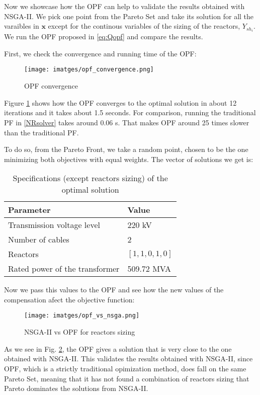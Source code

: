 \documentclass[a4paper,11pt, titlepage, twoside]{article}
\begin{document}
Now we showcase how the OPF can help to validate the results obtained with NSGA-II. We pick one point from the Pareto Set and  take its solution for all the varaibles in $\mathbf{x}$
except for the continous variables of the sizing of the reactors, $Y_{sh_i}$. We run the OPF proposed in \ref{eq:Qopf} and compare the results.

First, we check the convergence and running time of the OPF:
\begin{figure}[H]
    \centering
    \texttt{[image: imatges/opf\_convergence.png]}
    \caption{OPF convergence}
    \label{fig:opfconv}   
\end{figure}
Figure \ref{fig:opfconv} shows how the OPF converges to the optimal solution in about 12 iterations and it takes about 1.5 seconds. For comparison, running the traditional PF in \ref{NRsolver} takes around 0.06 s.
That makes OPF around 25 times slower than the traditional PF.

To do so, from the Pareto Front, we take a random point, chosen to be the one minimizing both objectives with equal weights. The vector of solutions we get is:
\begin{table}[H]
    \centering
    \begin{tabular}{l l}
    \hline
    \textbf{Parameter} & \textbf{Value} \\
    \hline
    Transmission voltage level & 220 kV \\
    Number of cables & 2 \\
    Reactors & $[1, 1, 0, 1, 0]$ \\
    Rated power of the transformer & 509.72 MVA \\
    \hline
    \end{tabular}
    \caption{Specifications (except reactors sizing) of the optimal solution}
    \label{table:optimalvaluesdicrete}
    \end{table}

Now we pass this values to the OPF and see how the new values of the compensation afect the objective function:
\begin{figure}[H]
    \centering
    \texttt{[image: imatges/opf\_vs\_nsga.png]}
    \caption{NSGA-II vs OPF for reactors sizing}
    \label{fig:opfvsnsga}   
\end{figure}
As we see in Fig. \ref{fig:opfvsnsga}, the OPF gives a solution that is very close to the one obtained with NSGA-II. This validates the results obtained with NSGA-II, since OPF, which is a strictly traditional opimization method, does fall on the same Pareto Set, meaning that it has not found a combination of reactors sizing that Pareto 
dominates the solutions from NSGA-II.
\end{document}
